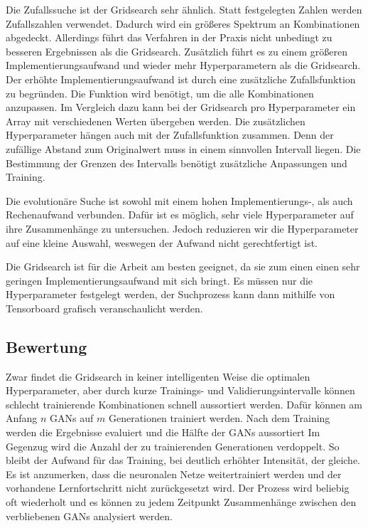 Die Zufallssuche ist der Gridsearch sehr ähnlich.
Statt festgelegten Zahlen werden Zufallszahlen verwendet.
Dadurch wird ein größeres Spektrum an Kombinationen abgedeckt.
Allerdings führt das Verfahren in der Praxis nicht unbedingt zu besseren Ergebnissen als die Gridsearch.
Zusätzlich führt es zu einem größeren Implementierungsaufwand und wieder mehr Hyperparametern als die Gridsearch.
Der erhöhte Implementierungsaufwand ist durch eine zusätzliche Zufallsfunktion zu begründen.
Die Funktion wird benötigt, um die alle Kombinationen anzupassen.
Im Vergleich dazu kann bei der Gridsearch pro Hyperparameter ein Array mit verschiedenen Werten übergeben werden.
Die zusätzlichen Hyperparameter hängen auch mit der Zufallsfunktion zusammen.
Denn der zufällige Abstand zum Originalwert muss in einem sinnvollen Intervall liegen.
Die Bestimmung der Grenzen des Intervalls benötigt zusätzliche Anpassungen und Training.

Die evolutionäre Suche ist sowohl mit einem hohen Implementierungs-, als auch Rechenaufwand verbunden.
Dafür ist es möglich, sehr viele Hyperparameter auf ihre Zusammenhänge zu untersuchen.
Jedoch reduzieren wir die Hyperparameter auf eine kleine Auswahl, weswegen der Aufwand nicht gerechtfertigt ist.

Die Gridsearch ist für die Arbeit am besten geeignet, da sie zum einen einen sehr geringen Implementierungsaufwand mit sich bringt.
Es müssen nur die Hyperparameter festgelegt werden, der Suchprozess kann dann mithilfe von Tensorboard grafisch veranschaulicht werden.

\subsection{Bewertung}
Zwar findet die Gridsearch in keiner intelligenten Weise die optimalen Hyperparameter, aber durch kurze Trainings- und Validierungsintervalle können schlecht trainierende Kombinationen schnell aussortiert werden.
Dafür können am Anfang $n$ GANs auf $m$ Generationen trainiert werden.
Nach dem Training werden die Ergebnisse evaluiert und die Hälfte der GANs aussortiert 
Im Gegenzug wird die Anzahl der zu trainierenden Generationen verdoppelt.
So bleibt der Aufwand für das Training, bei deutlich erhöhter Intensität, der gleiche.
Es ist anzumerken, dass die neuronalen Netze weitertrainiert werden und der vorhandene Lernfortschritt nicht zurückgesetzt wird.
Der Prozess wird beliebig oft wiederholt und es können zu jedem Zeitpunkt Zusammenhänge zwischen den verbliebenen GANs analysiert werden.


